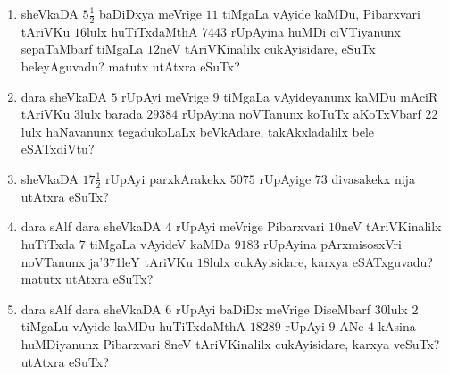 \begin{enumerate}[\rm (1)]
\item sheVkaDA $5\tfrac{1}{2}$ baDiDxya meVrige $11$ tiMgaLa vAyide kaMDu, Pibarxvari tAriVKu $16$lulx huTiTxdaMthA $7443$ rUpAyina huMDi ciVTiyanunx sepaTaMbarf tiMgaLa $12$neV tAriVKinalilx cukAyisidare, eSuTx beleyAguvadu? matutx utAtxra eSuTx?

\item dara sheVkaDA $5$ rUpAyi meVrige $9$ tiMgaLa vAyideyanunx kaMDu mAciR tAriVKu $3$lulx barada $29384$ rUpAyina noVTanunx koTuTx aKoTxVbarf $22$lulx haNavanunx tegadukoLaLx beVkAdare, takAkxladalilx bele eSATxdiVtu?

\item sheVkaDA $17\tfrac{1}{2}$ rUpAyi parxkArakekx $5075$ rUpAyige $73$ divasakekx nija utAtxra eSuTx?

\item dara sAlf dara sheVkaDA $4$ rUpAyi meVrige Pibarxvari $10$neV tAriVKinalilx huTiTxda $7$ tiMgaLa vAyideV kaMDa $9183$ rUpAyina pArxmisosxVri noVTanunx ja\char'371leY tAriVKu $18$lulx cukAyisidare, karxya eSATxguvadu? matutx utAtxra eSuTx?

\item dara sAlf dara sheVkaDA $6$ rUpAyi baDiDx meVrige DiseMbarf $30$lulx $2$ tiMgaLu vAyide kaMDu huTiTxdaMthA $18289$ rUpAyi $9$ ANe $4$ kAsina huMDiyanunx Pibarxvari $8$neV tAriVKinalilx cukAyisidare, karxya veSuTx? utAtxra eSuTx?

\end{enumerate}
